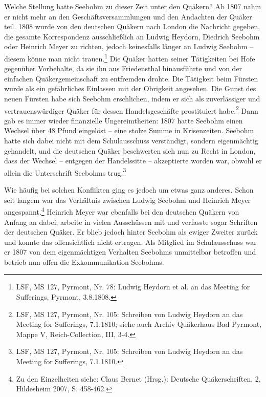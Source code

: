 Welche Stellung hatte Seebohm zu dieser Zeit unter den Quäkern? Ab 1807 nahm er
nicht mehr an den Geschäftsversammlungen und
den Andachten der Quäker teil. 1808 wurde von den
deutschen Quäkern nach London die Nachricht
gegeben, die gesamte Korrespondenz ausschließlich an Ludwig
Heydorn, Diedrich
Seebohm oder Heinrich
Meyer zu richten, jedoch keinesfalls länger an
Ludwig Seebohm -- diesem könne man nicht trauen.\footnote{LSF, MS 127, Pyrmont,
Nr. 78: Ludwig Heydorn et al. an das Meeting for
Sufferings, Pyrmont, 3.8.1808.} Die Quäker hatten seiner Tätigkeiten bei Hofe
gegenüber Vorbehalte, da sie ihn aus Friedensthal hinausführte und von der
einfachen Quäkergemeinschaft zu entfremden drohte. Die Tätigkeit beim Fürsten
wurde als ein gefährliches Einlassen mit der Obrigkeit angesehen. Die Gunst des
neuen Fürsten habe sich Seebohm erschlichen, indem er sich als zuverlässiger und
vertrauenswürdiger Quäker für dessen Handelsgeschäfte
prostituiert habe.\footnote{LSF, MS 127, Pyrmont, Nr. 105:
Schreiben von Ludwig Heydorn an das Meeting
for Sufferings, 7.1.1810; siehe auch Archiv Quäkerhaus Bad Pyrmont, Mappe V,
Reich-Collection, III, 3-4.}
Dann gab es immer wieder finanzielle Ungereimtheiten: 1807 hatte Seebohm einen
Wechsel über 48 Pfund eingelöst -- eine stolze Summe in Krisenzeiten. Seebohm
hatte sich dabei nicht mit dem Schulausschuss
verständigt, sondern eigenmächtig gehandelt, und die deutschen Quäker
beschwerten sich nun zu Recht in London, dass der Wechsel -- entgegen der
Handelssitte -- akzeptierte worden war, obwohl er allein die Unterschrift
Seebohms trug.\footnote{LSF, MS 127, Pyrmont, Nr. 105: Schreiben von Ludwig
Heydorn an das Meeting
for Sufferings, 7.1.1810.}

\medskip

Wie häufig bei solchen Konflikten ging es jedoch um
etwas ganz anderes. Schon seit langem war das Verhältnis zwischen Ludwig Seebohm
und Heinrich Meyer angespannt.\footnote{Zu den Einzelheiten siehe: Claus Bernet
(Hrsg.): Deutsche Quäkerschriften,
2, Hildesheim 2007, S. 458-462.} Heinrich Meyer war ebenfalls bei den deutschen
Quäkern von Anfang an dabei, arbeite in vielen Ausschüssen mit und verfasste
sogar Schriften der deutschen Quäker. Er blieb jedoch hinter Seebohm als ewiger
Zweiter zurück und konnte das offensichtlich nicht ertragen. Als Mitglied im
Schulausschuss war er 1807 von dem eigenmächtigen Verhalten Seebohms unmittelbar
betroffen und betrieb nun offen die
Exkommunikation Seebohms.

